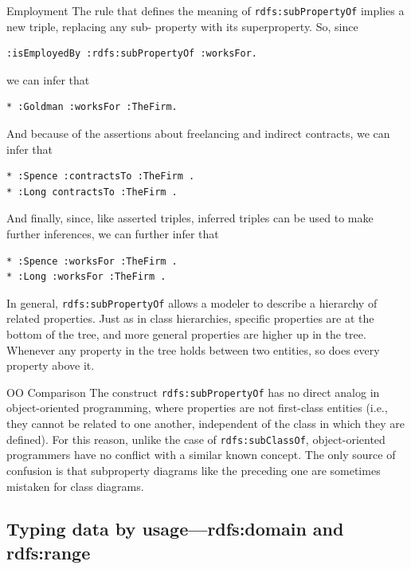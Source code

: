\begin{example}{Employment}
The rule that defines the meaning of \texttt{rdfs:subPropertyOf} implies a new
triple, replacing any sub- property with its superproperty. So, since

\begin{lstlisting}
:isEmployedBy :rdfs:subPropertyOf :worksFor.
\end{lstlisting}

we can infer that

\begin{lstlisting}
* :Goldman :worksFor :TheFirm.
\end{lstlisting}

And because of the assertions about freelancing and indirect contracts,
we can infer that

\begin{lstlisting}
* :Spence :contractsTo :TheFirm .
* :Long contractsTo :TheFirm .
\end{lstlisting}

And finally, since, like asserted triples, inferred triples can be used
to make further inferences, we can further infer that

\begin{lstlisting}
* :Spence :worksFor :TheFirm .
* :Long :worksFor :TheFirm .
\end{lstlisting}

In general, \texttt{rdfs:subPropertyOf} allows a modeler to describe a hierarchy
of related properties. Just as in class hierarchies, specific properties
are at the bottom of the tree, and more general properties are higher up
in the tree. Whenever any property in the tree holds between two
entities, so does every property above it.
\end{example}

\begin{sidebar}{OO Comparison}
The construct \texttt{rdfs:subPropertyOf} has no direct analog in object-oriented
programming, where properties are not first-class entities (i.e., they
cannot be related to one another, independent of the class in which they
are defined). For this reason, unlike the case of \texttt{rdfs:subClassOf},
object-oriented programmers have no conflict with a similar known
concept. The only source of confusion is that subproperty diagrams like
the preceding one are sometimes mistaken for class diagrams.
\end{sidebar}

\subsection{Typing data by usage---rdfs:domain and rdfs:range}
\label{section:domainrange}

